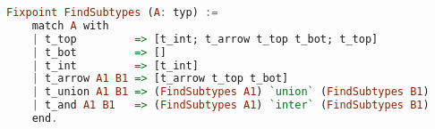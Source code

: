 \documentclass[a4paper]{article}
\begin{document}
\bigskip

\begin{lstlisting}[language=Haskell]
Fixpoint FindSubtypes (A: typ) :=
    match A with
    | t_top         => [t_int; t_arrow t_top t_bot; t_top]
    | t_bot         => []
    | t_int         => [t_int]
    | t_arrow A1 B1 => [t_arrow t_top t_bot]
    | t_union A1 B1 => (FindSubtypes A1) `union` (FindSubtypes B1)
    | t_and A1 B1   => (FindSubtypes A1) `inter` (FindSubtypes B1)
    end.
\end{lstlisting}

\bigskip

\ottdefnsOrdinary



\ottdefnsSubtyping

\ottdefnsTyping

\ottdefnsReduction
\end{document}
